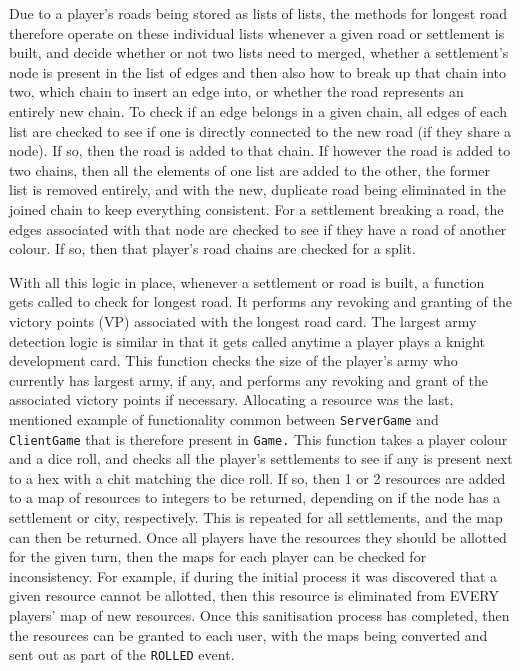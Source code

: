 \documentclass[a4paper,doc]{apa6}
\newcommand{\code}{\texttt}
\begin{document}
Due to a player’s roads being stored as lists of lists, the methods for longest road therefore operate on these individual lists whenever a given road or settlement is built, and decide whether or not two lists need to merged, whether a settlement’s node is present in the list of edges and then also how to break up that chain into two, which chain to insert an edge into, or whether the road represents an entirely new chain. To check if an edge belongs in a given chain, all edges of each list are checked to see if one is directly connected to the new road (if they share a node). If so, then the road is added to that chain. If however the road is added to two chains, then all the elements of one list are added to the other, the former list is removed entirely, and with the new, duplicate road being eliminated in the joined chain to keep everything consistent.  For a settlement breaking a road, the edges associated with that node are checked to see if they have a road of another colour. If so, then that player’s road chains are checked for a split.

With all this logic in place, whenever a settlement or road is built, a function gets called to check for longest road. It performs any revoking and granting of the victory points (VP) associated with the longest road card. The largest army detection logic is similar in that it gets called anytime a player plays a knight development card. This function checks the size of the player’s army who currently has largest army, if any, and performs any revoking and grant of the associated victory points if necessary. Allocating a resource was the last, mentioned example of functionality common between \code{ServerGame} and \code{ClientGame} that is therefore present in \code{Game.} This function takes a player colour and a dice roll, and checks all the player’s settlements to see if any is present next to a hex with a chit matching the dice roll. If so, then 1 or 2 resources are added to a map of resources to integers to be returned, depending on if the node has a settlement or city, respectively. This is repeated for all settlements, and the map can then be returned. Once all players have the resources they should be allotted for the given turn, then the maps for each player can be checked for inconsistency. For example, if during the initial process it was discovered that a given resource cannot be allotted, then this resource is eliminated from EVERY players’ map of new resources. Once this sanitisation process has completed, then the resources can be granted to each user, with the maps being converted and sent out as part of the \code{ROLLED} event.
\end{document}
